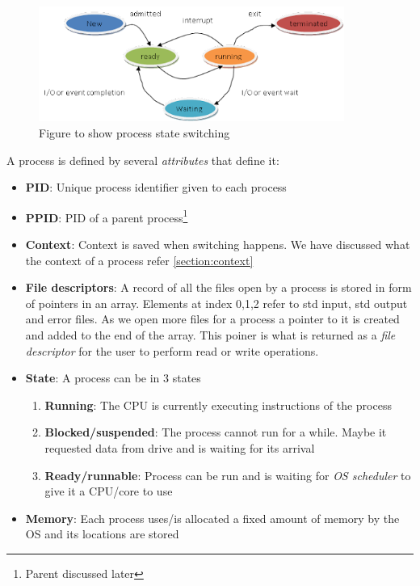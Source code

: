 \documentclass[12pt]{article}
\begin{document}
    \begin{figure}[h]
        \centering
        \includegraphics[width = 10cm]{process-state.png}
        \caption{Figure to show process state switching}
        \label{process-state}
    \end{figure}
    {\large A process is defined by several \textit{attributes} that define it:}
    \begin{itemize}[topsep=0pt, partopsep=0pt, itemsep=0pt, parsep=0pt]
        \item \textbf{PID}: Unique process identifier given to each process
        \item \textbf{PPID}: PID of a parent process\footnote{Parent discussed later}
        \item \textbf{Context}: Context is saved when switching happens. We have discussed what the context of a process refer \ref{section:context}
        \item \textbf{File descriptors}: A record of all the files open by a process is stored in form of pointers in 
        an array. Elements at index 0,1,2 refer to std input, std output and error files. As we open more files for
        a process a pointer to it is created and added to the end of the array. This poiner is what is returned as a 
        \textit{file descriptor} for the user to perform read or write operations.
        \item \textbf{State}: A process can be in 3 states
        \begin{enumerate}[topsep=0pt, partopsep=0pt, itemsep=0pt, parsep=0pt]
            \item \textbf{Running}: The CPU is currently executing instructions of the process
            \item \textbf{Blocked/suspended}: The process cannot run for a while. Maybe it requested data from drive and is waiting for its arrival
            \item \textbf{Ready/runnable}: Process can be run and is waiting for \textit{OS scheduler} to give it a CPU/core to use
        \end{enumerate}
        \item \textbf{Memory}: Each process uses/is allocated a fixed amount of memory by the OS and its locations are stored

\end{itemize}
\end{document}
